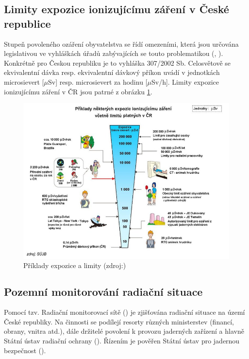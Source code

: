 \subsection{Limity expozice ionizujícímu záření v České republice}
\label{sub:limity}
Stupeň povoleného ozáření obyvatelstva se řídí omezeními, která jsou určována legislativou ve vyhláškách úřadů zabývajících se touto problematikou (, ). Konkrétně pro Českou republiku je to vyhláška  307/2002 Sb. Celosvětově se ekvivalentní dávka resp. ekvivalentní dávkový příkon uvádí v jednotkách microsievert [$\mu$Sv] resp. microsievert za hodinu [$\mu$Sv/h]. Limity expozice ionizujícímu záření v ČR jsou patrné z obrázku \ref{fig:davkyCR}. \cite{suroPriRadOch} 

\begin{figure}[H]
    \centering
    \includegraphics[scale=0.6]{./pictures/davkyCR.jpeg}
      	\caption[Příklady expozice a limity]{Příklady expozice a limity (zdroj:\cite{suroOcek})}
    	\label{fig:davkyCR}
\end{figure} 

\subsection{Pozemní monitorování radiační situace}
Pomocí tzv. Radiační monitorovací sítě () je zjišťována radiační situace na území České republiky. Na činnosti  se podílejí resorty různých ministerstev (financí, obrany, vnitra atd.), dále držitelé povolení k provozu jaderných zařízení a hlavně Státní ústav radiační ochrany (). Řízením je pověřen Státní ústav pro jadernou bezpečnost (). \cite{suroRMS}


